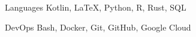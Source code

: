 

\begin{cvpairs}

  
\cvpair
    {Languages} %
    {Kotlin, LaTeX, Python, R, Rust, SQL} %


\cvpair
    {DevOps} %
    {Bash, Docker, Git, GitHub, Google Cloud} %

\end{cvpairs}